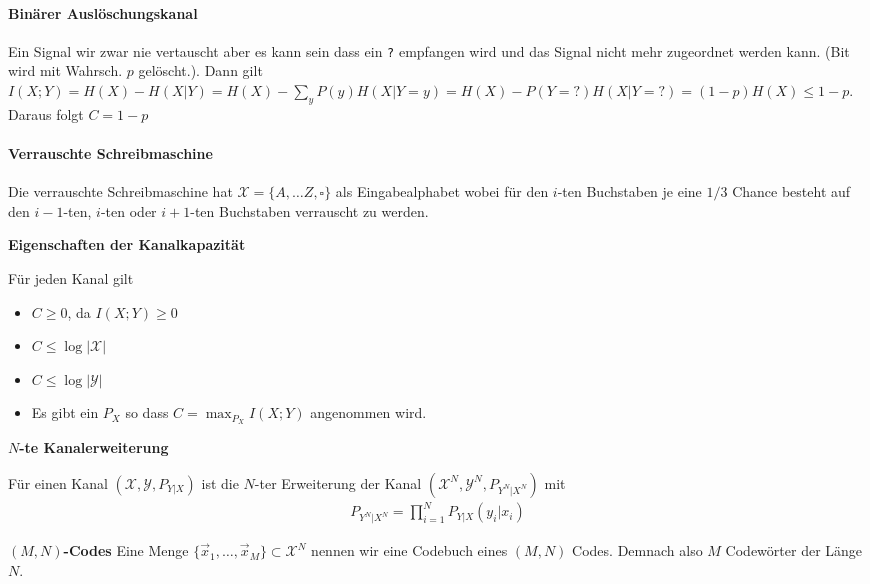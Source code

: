 \documentclass[25pt]{sciposter}
\newenvironment{defn}[1]{\begin{mdframed}[backgroundcolor=blue!10,innertopmargin=15pt, nobreak=true,innerbottommargin=15pt]
		\textbf{#1 }
	}
	{ 
	\end{mdframed}
}
\newenvironment{thm}[1]{\begin{mdframed}[nobreak=true,backgroundcolor=Emerald!10,innertopmargin=15pt, innerbottommargin=15pt]
		\textbf{#1 }
	}
	{ 
	\end{mdframed}
}
\newcommand{\TODO}[1]{\todo[inline]{\Large TODO:  #1}}
\begin{document}
\begin{multicols}{3}
\paragraph{Binärer Auslöschungskanal}
Ein Signal wir zwar nie vertauscht aber es kann sein dass ein \texttt{?} empfangen wird und das Signal nicht mehr zugeordnet werden kann. (Bit wird mit Wahrsch. $p$ gelöscht.). Dann gilt $I(X;Y) = H(X) - H(X|Y) = H(X) - \sum_{y} P(y) H(X|Y=y) = H(X) - P(Y=?)H(X|Y=?) = (1-p)H(X) \leq 1-p$. Daraus folgt $C = 1-p$

\paragraph{Verrauschte Schreibmaschine}
Die verrauschte Schreibmaschine hat $\mathcal{X} = \{A,\ldots Z,\square\}$ als Eingabealphabet wobei für den $i$-ten Buchstaben je eine $1/3$ Chance besteht auf den $i-1$-ten, $i$-ten oder $i+1$-ten Buchstaben verrauscht zu werden.
\TODO{es gilt C = $\log(9)$}






\begin{thm}{Eigenschaften der Kanalkapazität}
	Für jeden Kanal gilt
	\begin{itemize}
		\item $C \geq 0$, da $I(X;Y)\geq 0$
		\item $C \leq \log |\mathcal{X}|$
		\item $C \leq \log |\mathcal{Y}|$
		\item Es gibt ein $P_X$ so dass $C = \max_{P_X} I(X;Y)$ angenommen wird.
	\end{itemize}
\end{thm}



\begin{defn}{$N$-te Kanalerweiterung}
Für einen Kanal $(\mathcal{X},\mathcal{Y}, P_{Y|X})$ ist die $N$-ter Erweiterung der Kanal $(\mathcal{X}^N, \mathcal{Y}^N, P_{Y^N|X^N})$ mit\begin{align*}
	P_{Y^N | X^N} = \prod_{i=1}^{N} P_{Y|X}(y_i|x_i)
\end{align*}
\end{defn}



\begin{defn}{$(M,N)$-Codes} Eine Menge $\{\vec{x}_1,\ldots, \vec{x}_M\} \subset \mathcal{X}^N$ nennen wir eine Codebuch eines $(M,N)$ Codes. Demnach also $M$ Codewörter der Länge $N$.
	

\end{defn}
\end{multicols}
\end{document}

